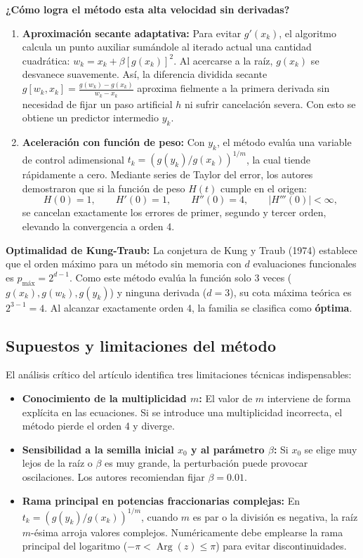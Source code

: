 ﻿\documentclass[10pt, a4paper]{article}
\begin{document}
\textbf{¿Cómo logra el método esta alta velocidad sin derivadas?}
\begin{enumerate}
    \item \textbf{Aproximación secante adaptativa:} Para evitar $g'(x_k)$, el algoritmo calcula un punto auxiliar sumándole al iterado actual una cantidad cuadrática: $w_k = x_k + \beta [g(x_k)]^2$. Al acercarse a la raíz, $g(x_k)$ se desvanece suavemente. Así, la diferencia dividida secante $g[w_k, x_k] = \frac{g(w_k)-g(x_k)}{w_k-x_k}$ aproxima fielmente a la primera derivada sin necesidad de fijar un paso artificial $h$ ni sufrir cancelación severa. Con esto se obtiene un predictor intermedio $y_k$.
    \item \textbf{Aceleración con función de peso:} Con $y_k$, el método evalúa una variable de control adimensional $t_k = (g(y_k)/g(x_k))^{1/m}$, la cual tiende rápidamente a cero. Mediante series de Taylor del error, los autores demostraron que si la función de peso $H(t)$ cumple en el origen:
    \begin{equation}
        H(0) = 1, \qquad H'(0) = 1, \qquad H''(0) = 4, \qquad |H'''(0)| < \infty,
    \end{equation}
    se cancelan exactamente los errores de primer, segundo y tercer orden, elevando la convergencia a orden 4.
\end{enumerate}

\textbf{Optimalidad de Kung-Traub:}
La conjetura de Kung y Traub (1974) establece que el orden máximo para un método sin memoria con $d$ evaluaciones funcionales es $p_{\text{máx}} = 2^{d-1}$. Como este método evalúa la función solo 3 veces ($g(x_k), g(w_k), g(y_k)$) y ninguna derivada ($d=3$), su cota máxima teórica es $2^{3-1} = 4$. Al alcanzar exactamente orden 4, la familia se clasifica como \textbf{óptima}.

\subsection{Supuestos y limitaciones del método}
El análisis crítico del artículo identifica tres limitaciones técnicas indispensables:
\begin{itemize}
    \item \textbf{Conocimiento de la multiplicidad $m$:} El valor de $m$ interviene de forma explícita en las ecuaciones. Si se introduce una multiplicidad incorrecta, el método pierde el orden 4 y diverge.
    \item \textbf{Sensibilidad a la semilla inicial $x_0$ y al parámetro $\beta$:} Si $x_0$ se elige muy lejos de la raíz o $\beta$ es muy grande, la perturbación puede provocar oscilaciones. Los autores recomiendan fijar $\beta = 0.01$.
    \item \textbf{Rama principal en potencias fraccionarias complejas:} En $t_k = (g(y_k)/g(x_k))^{1/m}$, cuando $m$ es par o la división es negativa, la raíz $m$-ésima arroja valores complejos. Numéricamente debe emplearse la rama principal del logaritmo ($-\pi < \operatorname{Arg}(z) \le \pi$) para evitar discontinuidades.
\end{itemize}
\end{document}
